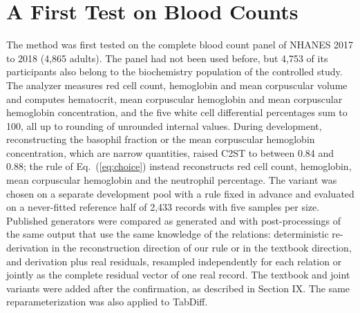 \documentclass[conference]{IEEEtran}
\begin{document}
\section{A First Test on Blood Counts}

The method was first tested on the complete blood count panel of NHANES 2017 to 2018 (4,865 adults). The panel had not been used before, but 4,753 of its participants also belong to the biochemistry population of the controlled study. The analyzer measures red cell count, hemoglobin and mean corpuscular volume and computes hematocrit, mean corpuscular hemoglobin and mean corpuscular hemoglobin concentration, and the five white cell differential percentages sum to 100, all up to rounding of unrounded internal values. During development, reconstructing the basophil fraction or the mean corpuscular hemoglobin concentration, which are narrow quantities, raised C2ST to between 0.84 and 0.88; the rule of Eq.~(\ref{eq:choice}) instead reconstructs red cell count, hemoglobin, mean corpuscular hemoglobin and the neutrophil percentage. The variant was chosen on a separate development pool with a rule fixed in advance and evaluated on a never-fitted reference half of 2,433 records with five samples per size. Published generators were compared as generated and with post-processings of the same output that use the same knowledge of the relations: deterministic re-derivation in the reconstruction direction of our rule or in the textbook direction, and derivation plus real residuals, resampled independently for each relation or jointly as the complete residual vector of one real record. The textbook and joint variants were added after the confirmation, as described in Section IX. The same reparameterization was also applied to TabDiff.
\end{document}
